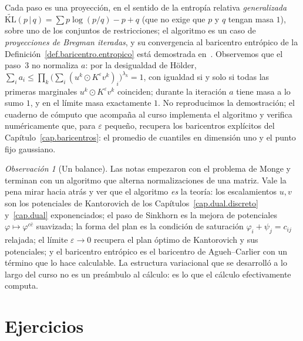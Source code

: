 \documentclass[12pt, a4paper]{amsbook}
\theoremstyle{remark}
\newtheorem{obs}[teo]{Observación}
\theoremstyle{definition}
\numberwithin{section}{chapter}
\numberwithin{subsection}{section}
\numberwithin{equation}{section}
\numberwithin{figure}{chapter}
\begin{document}
Cada paso es una proyección, en el sentido de la entropía relativa
\emph{generalizada} $\widetilde{\mathrm{KL}}(p\,|\,q)=\sum p\log(p/q)-p+q$
(que no exige que $p$ y $q$ tengan masa $1$), sobre uno de los conjuntos de
restricciones; el algoritmo es un caso de
\emph{proyecciones de Bregman iteradas}, y su convergencia al baricentro
entrópico de la Definición~\ref{def.baricentro.entropico} está demostrada
en~\cite{Benamou2015}. Observemos que el paso~3 no normaliza $a$: por la
desigualdad de Hölder, $\sum_ia_i\le\prod_k\bigl(\sum_i(u^k\odot K^\varepsilon v^k)_i\bigr)^{\lambda_k}=1$,
con igualdad si y solo si todas las primeras marginales
$u^k\odot K^\varepsilon v^k$ coinciden; durante la iteración $a$ tiene
masa a lo sumo $1$, y en el límite masa exactamente $1$. No reproducimos la
demostración; el cuaderno de cómputo que acompaña al curso implementa el
algoritmo y verifica numéricamente que, para $\varepsilon$ pequeño, recupera
los baricentros explícitos del Capítulo~\ref{cap.baricentros}: el promedio
de cuantiles en dimensión uno y el punto fijo gaussiano.

\begin{obs}[Un balance]
Las notas empezaron con el problema de Monge y terminan con un algoritmo que
alterna normalizaciones de una matriz. Vale la pena mirar hacia atrás y ver
que el algoritmo \emph{es} la teoría: los escalamientos $u,v$ son los
potenciales de Kantorovich de los Capítulos~\ref{cap.dual.discreto}
y~\ref{cap.dual} exponenciados; el paso de Sinkhorn es la mejora de
potenciales $\varphi\mapsto\varphi^{c\bar c}$ suavizada; la forma del plan es
la condición de saturación $\varphi_i+\psi_j=c_{ij}$ relajada; el límite
$\varepsilon\to0$ recupera el plan óptimo de Kantorovich y sus potenciales; y
el baricentro entrópico es el baricentro de Agueh--Carlier con un término
que lo hace calculable. La estructura variacional que se desarrolló a lo
largo del curso no es un preámbulo al cálculo: es lo que el cálculo
efectivamente computa.
\end{obs}


\section*{Ejercicios}
\end{document}
